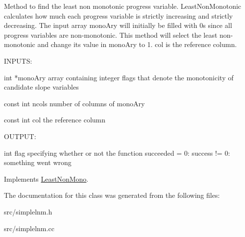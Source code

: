 Method to find the least non monotonic progress variable. LeastNonMonotonic calculates how much each progress variable is strictly increasing and strictly decreasing. The input array monoAry will initially be filled with 0s since all progress variables are non-\/monotonic. This method will select the least non-\/monotonic and change its value in monoAry to 1. col is the reference column.

\begin{DoxyVerb}
INPUTS: 

int *monoAry      array containing integer flags that denote the monotonicity of candidate slope variables

const int ncols   number of columns of monoAry

const int col     the reference column

OUTPUT:

int               flag specifying whether or not the function succeeded 
                   = 0: success
		  != 0: something went wrong

\end{DoxyVerb}
 

Implements \hyperlink{classLeastNonMono_a239cbd7836950dc7c758138c4db00d0c}{LeastNonMono}.

The documentation for this class was generated from the following files:\begin{DoxyCompactItemize}
\item 
src/simplelnm.h\item 
src/simplelnm.cc\end{DoxyCompactItemize}
